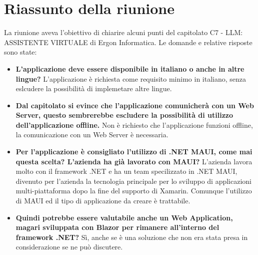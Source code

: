 \section{Riassunto della riunione}

    La riunione aveva l'obiettivo di chiarire alcuni punti del capitolato C7 - LLM: ASSISTENTE VIRTUALE di Ergon Informatica. Le domande e relative risposte sono state:
\begin{itemize}
    \item \textbf{L'applicazione deve essere disponibile in italiano o anche in altre lingue?} L'applicazione è richiesta come requisito minimo in italiano, senza eslcudere la possibilità di implemetare altre lingue.
    \item \textbf{Dal capitolato si evince che l'applicazione comunicherà con un Web Server, questo sembrerebbe escludere la possibilità di utilizzo dell'applicazione offline.} Non è richiesto che l'applicazione funzioni offline, la comunicazione con un Web Server è necessaria.
     \item \textbf{Per l'applicazione è consigliato l'utilizzo di .NET MAUI, come mai questa scelta? L'azienda ha già lavorato con MAUI?} L'azienda lavora molto con il framework .NET e ha un team specilizzato in .NET MAUI, divenuto per l'azienda la tecnologia principale per lo sviluppo di applicazioni multi-piattaforma dopo la fine del supporto di Xamarin. Comunque l'utilizzo di MAUI ed il tipo di applicazione da creare è trattabile. 
            \item \textbf{Quindi potrebbe essere valutabile anche un Web Application, magari sviluppata con Blazor per rimanere all'interno del framework .NET?} Sì, anche se è una soluzione che non era stata presa in considerazione se ne può discutere.

\end{itemize}


